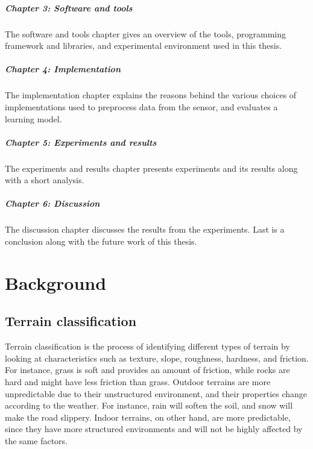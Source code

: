 \documentclass[USenglish]{ifimaster}  %
\begin{document}
\paragraph{Chapter 3: Software and tools}
The software and tools chapter gives an overview of the tools, programming framework and libraries, and experimental environment used in this thesis. 	

\paragraph{Chapter 4: Implementation}
The implementation chapter explains the reasons behind the various choices of implementations used to preprocess data from the sensor, and evaluates a learning model.
	
\paragraph{Chapter 5: Experiments and results}
The experiments and results chapter presents experiments and its results along with a short analysis.
	
\paragraph{Chapter 6: Discussion}
The discussion chapter discusses the results from the experiments. Last is a conclusion along with the future work of this thesis.
	
\chapter{Background}                  %
\section{Terrain classification}
Terrain classification is the process of identifying different types of terrain by looking at characteristics such as texture, slope, roughness, hardness, and friction. For instance, grass is soft and provides an amount of friction, while rocks are hard and might have less friction than grass. Outdoor terrains are more unpredictable due to their unstructured environment, and their properties change according to the weather. For instance, rain will soften the soil, and snow will make the road slippery. Indoor terrains, on other hand, are more predictable, since they have more structured environments and will not be highly affected by the same factors.
\end{document}
